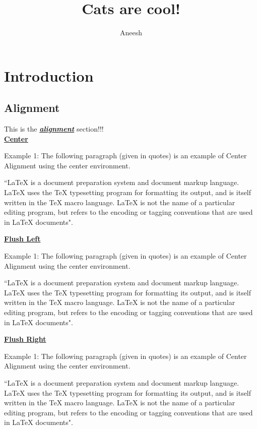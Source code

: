 \documentclass[12pt]{article}
\title{Cats are cool!}
\author{Aneesh}
\date{}
\begin{document}
\maketitle %

\section{Introduction}
\subsection{Alignment}
This is the \underline{\textit{\textbf{alignment}}} section!!! \\

\underline{\textbf{Center}}
\begin{center}
Example 1: The following paragraph (given in quotes) is an 
example of Center Alignment using the center environment. 

``LaTeX is a document preparation system and document markup 
language. LaTeX uses the TeX typesetting program for formatting 
its output, and is itself written in the TeX macro language. 
LaTeX is not the name of a particular editing program, but 
refers to the encoding or tagging conventions that are used 
in LaTeX documents".
\end{center}


\underline{\textbf{Flush Left}}
\begin{flushleft}
Example 1: The following paragraph (given in quotes) is an 
example of Center Alignment using the center environment. 

``LaTeX is a document preparation system and document markup 
language. LaTeX uses the TeX typesetting program for formatting 
its output, and is itself written in the TeX macro language. 
LaTeX is not the name of a particular editing program, but 
refers to the encoding or tagging conventions that are used 
in LaTeX documents".
\end{flushleft}


\underline{\textbf{Flush Right}}
\begin{flushright}
Example 1: The following paragraph (given in quotes) is an 
example of Center Alignment using the center environment. 

``LaTeX is a document preparation system and document markup 
language. LaTeX uses the TeX typesetting program for formatting 
its output, and is itself written in the TeX macro language. 
LaTeX is not the name of a particular editing program, but 
refers to the encoding or tagging conventions that are used 
in LaTeX documents".
\end{flushright}
\end{document}
